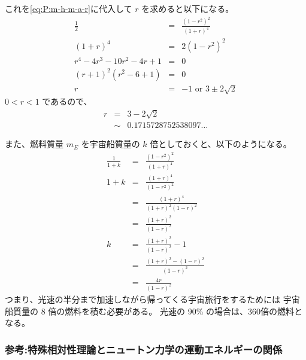 これを\eqref{eq:P:m-h-m-a-r}に代入して $r$ を求めると以下になる。
  \begin{eqnarray}
    \frac{1}{2}
      & = &
        \frac{(1 - r^2)^2}{(1+r)^4}
  \\
    (1+r)^4
      & = &
        2 (1-r^2)^2
  \\
    r^4 - 4r^3 - 10r^2 - 4r + 1
      & = & 0
  \\
    (r+1)^2 (r^2 - 6 + 1)
      & = & 0
  \\
    r
      & = & -1 \mbox{ or } 3 \pm 2\sqrt{2}
  \end{eqnarray}
$0 < r < 1$ であるので、
  \begin{eqnarray}
    r
      & = & 3 - 2 \sqrt{2}
  \\
      & \sim & 0.1715728752538097 \ldots
  \end{eqnarray}

また、燃料質量 $m_E$ を宇宙船質量の $k$ 倍としておくと、以下のようになる。
  \begin{eqnarray}
    \frac{1}{1+k}
      & = &
        \frac{(1 - r^2)^2}{(1+r)^4}
  \\
    1+k
      & = &
        \frac{(1+r)^4}{(1-r^2)^2}
  \\
      & = &
        \frac{(1+r)^4}{(1+r)^2(1-r)^2}
  \\
      & = &
        \frac{(1+r)^2}{(1-r)^2}
  \\
    k
      & = &
        \frac{(1+r)^2}{(1-r)^2} - 1
  \\
      & = &
        \frac{(1+r)^2 - (1-r)^2}{(1-r)^2}
  \\
      & = &
        \frac{4r}{(1-r)^2}
  \end{eqnarray}
つまり、光速の半分まで加速しながら帰ってくる宇宙旅行をするためには
宇宙船質量の 8 倍の燃料を積む必要がある。
光速の 90\% の場合は、360倍の燃料となる。

  
\subsubsection{参考:特殊相対性理論とニュートン力学の運動エネルギーの関係}
\label{sssec:宇宙船の加速:参考}

